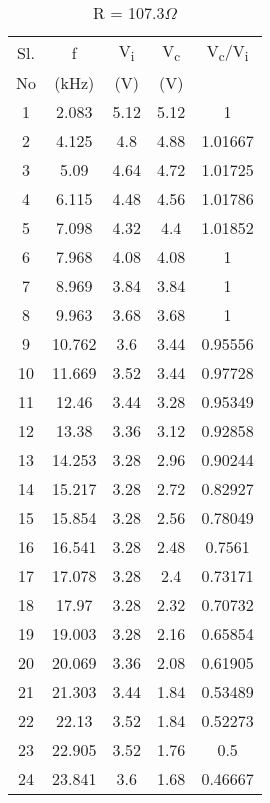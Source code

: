 \documentclass[a4paper]{article}
\begin{document}
\begin{table}[H]
\begin{center}
    \caption{R = 107.3$\Omega$}
    \label{tab:table1}
\resizebox{6cm}{!} {
   \begin{tabular}{|c|c|c|c|c|}
   \hline
Sl. & f    & V\textsubscript{\tiny i} & V\textsubscript{\tiny c} & V\textsubscript{\tiny c}/V\textsubscript{\tiny i}\\
No & (kHz)   & (V) & (V) & \\
\hline
1  & 2.083  & 5.12 & 5.12 & 1       \\
2  & 4.125  & 4.8  & 4.88 & 1.01667 \\
3  & 5.09   & 4.64 & 4.72 & 1.01725 \\
4  & 6.115  & 4.48 & 4.56 & 1.01786 \\
5  & 7.098  & 4.32 & 4.4  & 1.01852 \\
6  & 7.968  & 4.08 & 4.08 & 1       \\
7  & 8.969  & 3.84 & 3.84 & 1       \\
8  & 9.963  & 3.68 & 3.68 & 1       \\
9  & 10.762 & 3.6  & 3.44 & 0.95556 \\
10 & 11.669 & 3.52 & 3.44 & 0.97728 \\
11 & 12.46  & 3.44 & 3.28 & 0.95349 \\
12 & 13.38  & 3.36 & 3.12 & 0.92858 \\
13 & 14.253 & 3.28 & 2.96 & 0.90244 \\
14 & 15.217 & 3.28 & 2.72 & 0.82927 \\
15 & 15.854 & 3.28 & 2.56 & 0.78049 \\
16 & 16.541 & 3.28 & 2.48 & 0.7561  \\
17 & 17.078 & 3.28 & 2.4  & 0.73171 \\
18 & 17.97  & 3.28 & 2.32 & 0.70732 \\
19 & 19.003 & 3.28 & 2.16 & 0.65854 \\
20 & 20.069 & 3.36 & 2.08 & 0.61905 \\
21 & 21.303 & 3.44 & 1.84 & 0.53489 \\
22 & 22.13  & 3.52 & 1.84 & 0.52273 \\
23 & 22.905 & 3.52 & 1.76 & 0.5     \\
24 & 23.841 & 3.6  & 1.68 & 0.46667 \\
\hline
\end{tabular}
}
\end{center}
\end{table}
\end{document}
